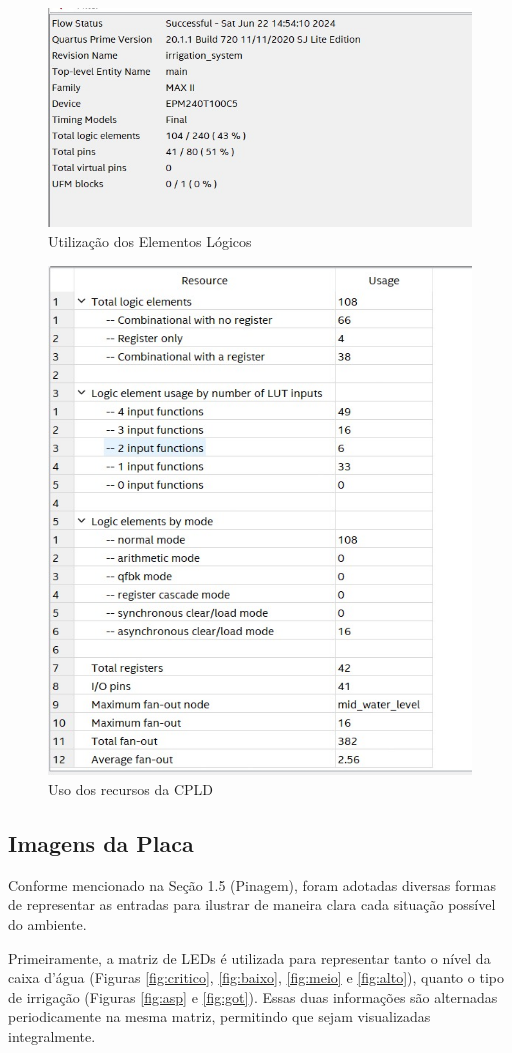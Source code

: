 \documentclass[
	article,			%
	11pt,				%
	oneside,			%
	a4paper,			%
	english,			%
	brazil,				%
	sumario=tradicional
	]{abntex2}
\begin{document}
\begin{figure}[H]
    \centering
    \includegraphics[width=0.65\linewidth]{LEs.png}
    \caption{Utilização dos Elementos Lógicos}
    \label{fig:LEs}
\end{figure}

\begin{figure} [H]
    \centering
    \includegraphics[width=0.6\linewidth]{LUTs.png}
    \caption{Uso dos recursos da CPLD}
    \label{fig:LUTs}
\end{figure}

\subsection{Imagens da Placa}

Conforme mencionado na Seção 1.5 (Pinagem), foram adotadas diversas formas de representar as entradas para ilustrar de maneira clara cada situação possível do ambiente.

Primeiramente, a matriz de LEDs é utilizada para representar tanto o nível da caixa d'água (Figuras \ref{fig:critico}, \ref{fig:baixo}, \ref{fig:meio} e \ref{fig:alto}), quanto o tipo de irrigação (Figuras \ref{fig:asp} e \ref{fig:got}). Essas duas informações são alternadas periodicamente na mesma matriz, permitindo que sejam visualizadas integralmente.
\end{document}
